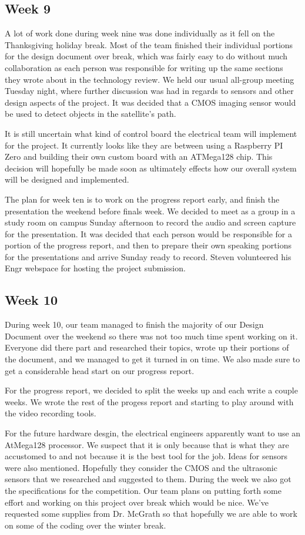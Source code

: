 \documentclass[10pt,letterpaper,onecolumn,draftclsnofoot,journal]{IEEEtran}
\begin{document}
\subsection{Week 9}
\par
A lot of work done during week nine was done individually as it fell on the Thanksgiving holiday break. Most of the team finished their individual portions for the design document over break, which was fairly easy to do without much collaboration as each person was responsible for writing up the same sections they wrote about in the technology review. We held our usual all-group meeting Tuesday night, where further discussion was had in regards to sensors and other design aspects of the project. It was decided that a CMOS imaging sensor would be used to detect objects in the satellite's path.
\par
It is still uncertain what kind of control board the electrical team will implement for the project. It currently looks like they are between using a Raspberry PI Zero and building their own custom board with an ATMega128 chip. This decision will hopefully be made soon as ultimately effects how our overall system will be designed and implemented.
\par
The plan for week ten is to work on the progress report early, and finish the presentation the weekend before finals week. We decided to meet as a group in a study room on campus Sunday afternoon to record the audio and screen capture for the presentation. It was decided that each person would be responsible for a portion of the progress report, and then to prepare their own speaking portions for the presentations and arrive Sunday ready to record. Steven volunteered his Engr webspace for hosting the project submission.

\subsection{Week 10}
During week 10, our team managed to finish the majority of our Design Document over the weekend so there was not too much time spent working on it. Everyone did there part and researched their topics, wrote up their portions of the document, and we managed to get it turned in on time. We also made sure to get a considerable head start on our progress report. 
\par
For the progress report, we decided to split the weeks up and each write a couple weeks. We wrote the rest of the progess report and starting to play around with the video recording tools.
\par
For the future hardware desgin, the electrical engineers apparently want to use an AtMega128 processor. We suspect that it is only because that is what they are accustomed to and not because it is the best tool for the job. Ideas for sensors were also mentioned. Hopefully they consider the CMOS and the ultrasonic sensors that we researched and suggested to them. During the week we also got the specifications for the competition. Our team plans on putting forth some effort and working on this project over break which would be nice. We've requested some supplies from Dr. McGrath so that hopefully we are able to work on some of the coding over the winter break. 
\end{document}

